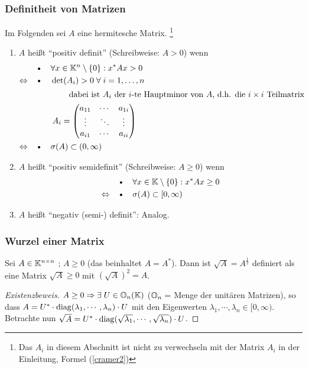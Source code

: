 \subsubsection{Definitheit von Matrizen}
Im Folgenden sei $A$ eine hermitesche Matrix.
\footnote{Das $A_i$ in diesem Abschnitt ist nicht zu verwechseln mit der Matrix $A_i$
in der Einleitung, Formel (\ref{cramer2})}
\begin{enumerate}
  \item [a)] $A$ heißt "`positiv definit"' (Schreibweise: $A > 0$) wenn
  \begin{align*}
    &\text{\textbullet} \quad \forall x \in \KK^n \setminus \{0\}: x^* A x > 0 \\
    \Leftrightarrow \quad &\text{\textbullet} \quad \det(A_i) > 0 \; \forall \; i = 1, \dots , n \\
    \intertext{\qquad \qquad \qquad dabei ist $A_i$ der $i$-te Hauptminor
    von $A$, d.h.
    die $i\times i$ Teilmatrix}
    & \quad \quad A_i =
    \begin{pmatrix}
      a_{11} & \cdots  & a_{1i} \\
      \vdots & \ddots & \vdots \\
      a_{i1} & \cdots & a_{ii}
    \end{pmatrix} \\
    \Leftrightarrow \quad &\text{\textbullet} \quad  \sigma (A) \subset (0, \infty)
  \end{align*}
  \item[b)]$A$ heißt "`positiv semidefinit"' (Schreibweise: $A \ge 0$) wenn
    \begin{align*}
    &\text{\textbullet} \quad \forall x \in \KK \setminus \{0\}: x^* A x \ge 0 \\
    \Leftrightarrow \quad &\text{\textbullet} \quad  \sigma (A) \subset [0, \infty)
  \end{align*}
  \item[c)] $A$ heißt "`negativ (semi-) definit"': Analog.
\end{enumerate}

\subsubsection{Wurzel einer Matrix}
Sei $A \in \mathbb K^{n \times n}$ ; $A \ge 0$ (das beinhaltet $A = A^*$). Dann ist
$\sqrt{A} = A^{\frac{1}{2}}$ definiert als eine Matrix $\sqrt{A} \ge 0$ mit
$\left(\sqrt{A} \right)^2 = A$.

\begin{proof}[Existenzbeweis]
$A \ge 0 \Rightarrow \exists \; U \in \mathbb O_n(\mathbb K)$ ($\mathbb O_n = $ Menge
der unitären Matrizen), so dass  \newline
$A = U^* \cdot \operatorname*{\mathrm{diag}}(\lambda_1, \cdots , \lambda_n) \cdot U$ mit den Eigenwerten
$\lambda_1, \cdots , \lambda_n \in [0, \infty)$. \newline
Betrachte nun $\sqrt{A} = U^* \cdot \operatorname*{\mathrm{diag}}(\sqrt{\lambda_1}, \cdots , \sqrt{\lambda_n}) \cdot U$.
\end{proof}

